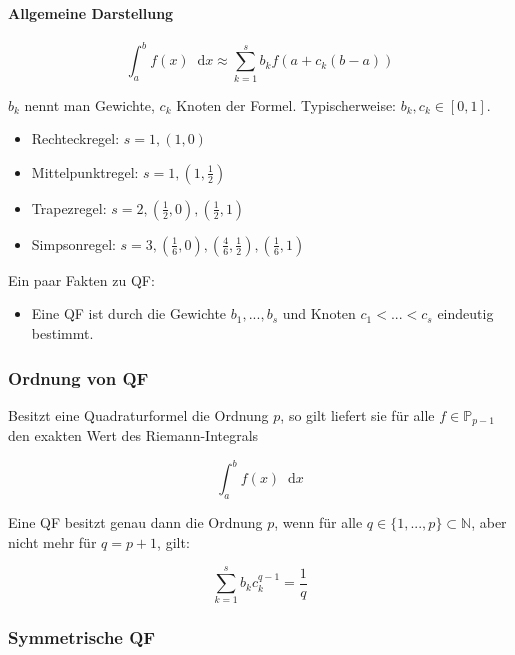 \documentclass[a4paper, 14pt]{article}
\newcommand*\diff{\mathop{}\!\mathrm{d}}
\begin{document}
	\paragraph{Allgemeine Darstellung}

	\begin{equation}
		\int_a^b{f(x) \diff x} \approx \sum_{k = 1}^{s}{b_k f(a + c_k (b - a))}
	\end{equation}

	$b_k$ nennt man Gewichte, $c_k$ Knoten der Formel.
	Typischerweise: $b_k, c_k \in [0, 1]$.

	\begin{itemize}
		\item Rechteckregel: $s = 1, (1, 0)$
		\item Mittelpunktregel: $s = 1, (1, \frac{1}{2})$
		\item Trapezregel: $s = 2, (\frac{1}{2}, 0), (\frac{1}{2}, 1)$
		\item Simpsonregel: $s = 3, (\frac{1}{6}, 0), (\frac{4}{6}, \frac{1}{2}), (\frac{1}{6}, 1)$
	\end{itemize}

	Ein paar Fakten zu QF:

	\begin{itemize}
		\item Eine QF ist durch die Gewichte $b_1, ..., b_s$ und Knoten $c_1 < ...  < c_s$ eindeutig bestimmt.
	\end{itemize}

	\subsubsection{Ordnung von QF}

	Besitzt eine Quadraturformel die Ordnung $p$, so gilt liefert sie für alle $f \in \mathbb{P}_{p-1}$ den exakten Wert des Riemann-Integrals

	\begin{equation}
		\int_a^b{f(x) \diff x}
	\end{equation}

	Eine QF besitzt genau dann die Ordnung $p$, wenn für alle $q \in \{1, ..., p\} \subset \mathbb{N}$, aber nicht mehr für $q = p + 1$, gilt:

	\begin{equation}
		\sum_{k = 1}^{s}{b_k c_k^{q - 1}} = \frac{1}{q}
	\end{equation}

	\subsubsection{Symmetrische QF}
\end{document}
